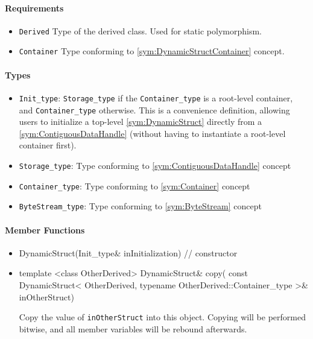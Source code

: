 \paragraph{Requirements}

\begin{itemize}
	\item \texttt{Derived} Type of the derived class. Used for static polymorphism.
	\item \texttt{Container} Type conforming to \ref{sym:DynamicStructContainer} concept.
\end{itemize}

\paragraph{Types}

\begin{itemize}
	\item \texttt{Init\_type}: \texttt{Storage\_type} if the \texttt{Container\_type} is a root-level container, and \texttt{Container\_type} otherwise. This is a convenience definition, allowing users to initialize a top-level \ref{sym:DynamicStruct} directly from a \ref{sym:ContiguousDataHandle} (without having to instantiate a root-level container first).
	\item \texttt{Storage\_type}: Type conforming to \ref{sym:ContiguousDataHandle} concept
	\item \texttt{Container\_type}: Type conforming to \ref{sym:Container} concept
	\item \texttt{ByteStream\_type}: Type conforming to \ref{sym:ByteStream} concept
\end{itemize}

\paragraph{Member Functions}

\begin{itemize}
	\item
		\begin{cppsnippet}
		DynamicStruct(Init_type& inInitialization) // constructor
		\end{cppsnippet}
		
	\item
		\begin{cppsnippet}
		template <class OtherDerived>
		DynamicStruct& copy(
		    const DynamicStruct<
		        OtherDerived,
		        typename OtherDerived::Container_type
		    >& inOtherStruct)
		\end{cppsnippet}
		
		Copy the value of \texttt{inOtherStruct} into this object. Copying will be performed bitwise, and all member variables will be rebound afterwards.
\end{itemize}

